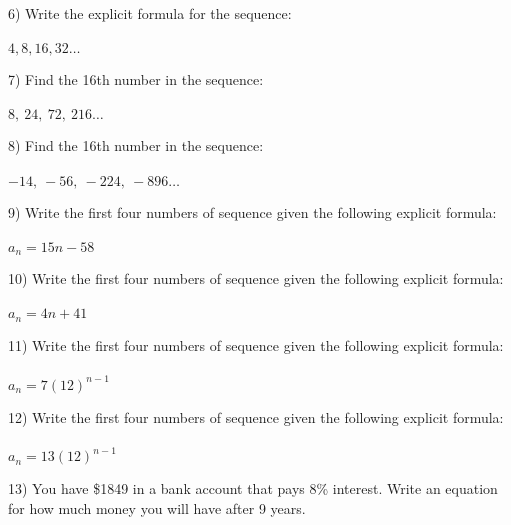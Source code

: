 \documentclass[12pt]{article}
\begin{document}
\hrulefill



6) Write the explicit formula for the sequence: \\ \\
$4, 8, 16, 32\ldots $


\hrulefill






7) Find the 16th number in the sequence: \\ \\
$8,~24,~72,~216\ldots $


\hrulefill




8) Find the 16th number in the sequence: \\ \\
$-14,~-56,~-224,~-896\ldots $


\hrulefill





9) Write the first four numbers of sequence given the following explicit formula: \\ \\
$a_n = 15n -58$ 


\hrulefill



10) Write the first four numbers of sequence given the following explicit formula: \\ \\
$a_n = 4n + 41$ 


\hrulefill





11) Write the first four numbers of sequence given the following
explicit formula: \\  \\
$a_n = 7(12)^{n-1}$
 

\hrulefill



12) Write the first four numbers of sequence given the following
explicit formula: \\  \\
$a_n = 13(12)^{n-1}$
 

\hrulefill








13) You have \$1849 in a bank account that pays 8\% interest. Write an equation for how much money you will have after 9 years. \\ \\
 
\end{document}
